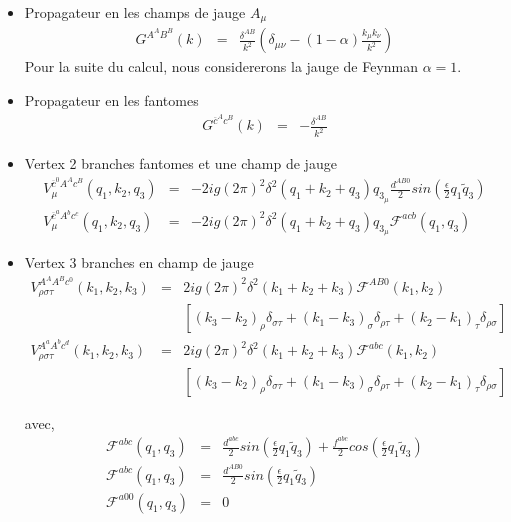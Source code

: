 \documentclass[a4paper,11pt]{article} %
\theoremstyle{plain}
\theoremstyle{definition}
\theoremstyle{remark}
\numberwithin{equation}{section}
\numberwithin{equation}{subsection}
\numberwithin{figure}{section}
\begin{document}
\begin{itemize}
 \item Propagateur en les champs de jauge $A_{\mu}$
\begin{eqnarray*}
 G^{ A^{A} B^{B} } (k)  &=&  \frac{ \delta^{AB} }{ k^2 } \left(  \delta_{\mu \nu}  - (1-\alpha)  \frac{ k_{\mu} k_{\nu} }{ k^2 } \right) 
\end{eqnarray*}
Pour la suite du calcul, nous considererons la jauge de Feynman  $\alpha=1$.
\item Propagateur en les fantomes
\begin{eqnarray*}
 G^{ \overline{c}^{A} c^{B} } (k)  &=& - \frac{ \delta^{AB} }{ k^2 } 
\end{eqnarray*}

\item Vertex 2 branches fantomes et une champ de jauge
\begin{eqnarray*}
 V_{\mu}^{ \overline{c}^{0} A^{A} c^{B} } (q_1 , k_2 , q_3 ) &=& -2ig (2 \pi)^2 \delta^{2} ( q_1 +k_2 +q_3 ) q_{3_{\mu}} \frac{d^{AB0}}{2} 
sin( \frac{\epsilon}{2}  q_1 \tilde{q}_3 ) \\
 V_{\mu}^{ \overline{c}^{a} A^{b} c^{c} } (q_1 , k_2 , q_3 ) &=& -2ig (2 \pi)^2 \delta^{2} ( q_1 +k_2 +q_3 ) q_{3_{\mu}} \mathcal{F}^{acb}(q_1 , q_3)
\end{eqnarray*}

\item Vertex 3 branches en champ de jauge
\begin{eqnarray*}
 V_{\rho  \sigma  \tau}^{ A^{A} A^{B} c^{0} } (k_1 , k_2 , k_3 ) &=&  2ig (2 \pi)^2 \delta^{2} ( k_1 + k_2 + k_3 )  \mathcal{F}^{AB0}(k_1 , k_2) \\
&&   \left[
(k_3  -  k_2)_{\rho}  \delta_{\sigma  \tau}  +  (k_1  -  k_3)_{\sigma}  \delta_{\rho  \tau}  +  (k_2  -  k_1)_{\tau}  \delta_{\rho  \sigma }
\right]      \\
  V_{\rho  \sigma  \tau}^{A^{a} A^{b} c^{d} } (k_1 , k_2 , k_3 ) &=& 2ig (2 \pi)^2 \delta^{2} ( k_1 + k_2 + k_3 )  \mathcal{F}^{abc}(k_1 , k_2)  \\
&&   \left[
(k_3  -  k_2)_{\rho}  \delta_{\sigma  \tau}  +  (k_1  -  k_3)_{\sigma}  \delta_{\rho  \tau}  +  (k_2  -  k_1)_{\tau}  \delta_{\rho  \sigma }
\right]
\end{eqnarray*}

avec,
\begin{eqnarray*}
 \mathcal{F}^{abc}(q_1 , q_3)  &=&  \frac{d^{abc}}{2}   sin \left(  \frac{\epsilon}{2}  q_1  \tilde{q}_3  \right)   +    \frac{f^{abc}}{2}   cos \left(  \frac{\epsilon}{2}  q_1  \tilde{q}_3   \right)   \\
 \mathcal{F}^{abc}(q_1 , q_3)  &=&  \frac{d^{AB0}}{2}   sin \left(  \frac{\epsilon}{2}  q_1  \tilde{q}_3  \right)  \\
 \mathcal{F}^{a00}(q_1 , q_3)  &=& 0
\end{eqnarray*}

\end{itemize}
\end{document}
